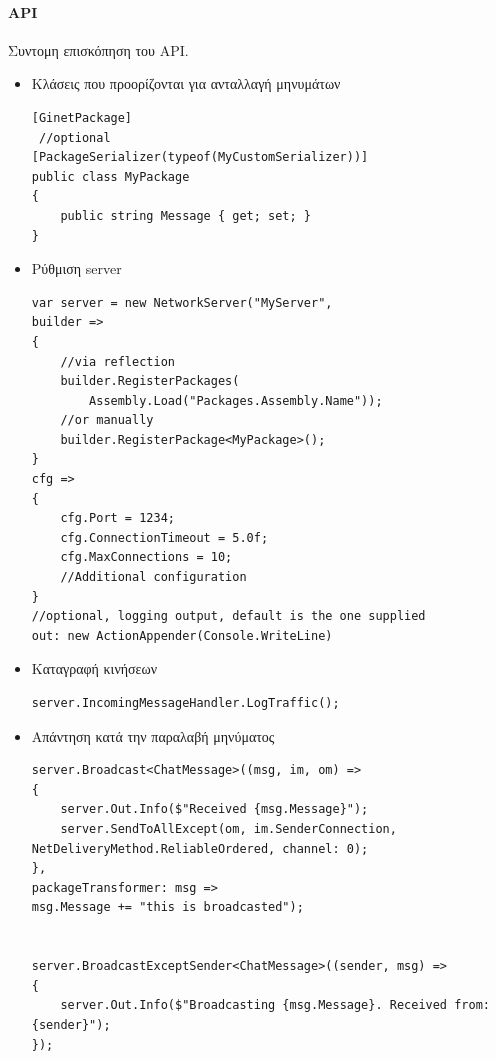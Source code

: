 \documentclass[oneside, 12pt]{book}
\begin{document}
	\paragraph{API}
	Συντομη επισκόπηση του API.
	\begin{itemize}
		\item Κλάσεις που προορίζονται για ανταλλαγή μηνυμάτων
		\lstset{style=sharpc}
		\begin{lstlisting}
[GinetPackage]
 //optional
[PackageSerializer(typeof(MyCustomSerializer))]
public class MyPackage
{
    public string Message { get; set; }
}          
		\end{lstlisting}
		\item Ρύθμιση server
		\lstset{style=sharpc}
		\begin{lstlisting}     
var server = new NetworkServer("MyServer",
builder =>
{
	//via reflection
	builder.RegisterPackages(
		Assembly.Load("Packages.Assembly.Name"));
	//or manually
	builder.RegisterPackage<MyPackage>();
}
cfg =>
{
	cfg.Port = 1234;
	cfg.ConnectionTimeout = 5.0f;
	cfg.MaxConnections = 10;
	//Additional configuration
}
//optional, logging output, default is the one supplied			 
out: new ActionAppender(Console.WriteLine) 
		\end{lstlisting}
		\item Καταγραφή κινήσεων		
		\lstset{style=sharpc}
		\begin{lstlisting}
server.IncomingMessageHandler.LogTraffic();
		\end{lstlisting}		
		\item Απάντηση κατά την παραλαβή μηνύματος
		\lstset{style=sharpc}
		\begin{lstlisting}
server.Broadcast<ChatMessage>((msg, im, om) =>
{
	server.Out.Info($"Received {msg.Message}");
	server.SendToAllExcept(om, im.SenderConnection, NetDeliveryMethod.ReliableOrdered, channel: 0);
}, 
packageTransformer: msg => 
msg.Message += "this is broadcasted");	


server.BroadcastExceptSender<ChatMessage>((sender, msg) =>
{
	server.Out.Info($"Broadcasting {msg.Message}. Received from: {sender}");
});
		\end{lstlisting} 		


\end{itemize}
\end{document}
